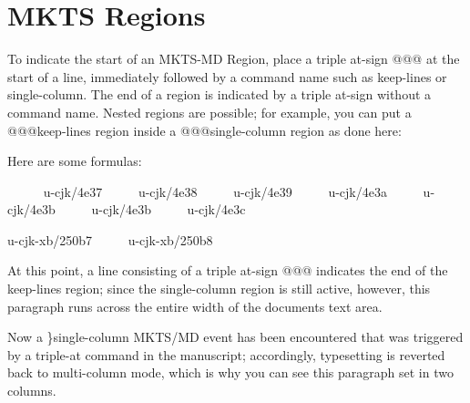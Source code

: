 
\mktsShowpar\par
\begin{multicols}{2}\mktsShowpar\par
\end{multicols}
\section{MKTS Regions 
}
\begin{multicols}{2}To indicate the start of an MKTS-MD Region, place a triple at-sign {\mktsStyleCode{}@@@}
at the start of a line, immediately followed by a command name such as
{\mktsStyleCode{}keep-lines} or {\mktsStyleCode{}single-column}. The end of a region is indicated by a
triple at-sign without a command name. Nested regions are possible; for example,
you can put a {\mktsStyleCode{}@@@keep-lines} region inside a {\mktsStyleCode{}@@@single-column} region as
done here:\mktsShowpar\par
\end{multicols}Here are some formulas:
\mktsShowpar\par
\begingroup{}     
{\mktsStyleCode{}u-cjk/4e37}     
{\mktsStyleCode{}u-cjk/4e38}     
{\mktsStyleCode{}u-cjk/4e39}     
{\mktsStyleCode{}u-cjk/4e3a}     
{\mktsStyleCode{}u-cjk/4e3b}     
{\mktsStyleCode{}u-cjk/4e3b}     
{\mktsStyleCode{}u-cjk/4e3c}     

{\mktsStyleCode{}u-cjk-xb/250b7}     
{\mktsStyleCode{}u-cjk-xb/250b8}     

\endgroup{}At this point, a line consisting of a triple at-sign {\mktsStyleCode{}@@@}
indicates the end of the {\mktsStyleCode{}keep-lines} region; since the
{\mktsStyleCode{}single-column} region is still active, however, {\mktsStyleItalic{}this
paragraph runs across the entire width} of the documents text
area.
\begin{multicols}{2}Now a {\mktsStyleCode{}\}single-column} MKTS/MD event has been encountered
that was triggered by a triple-at command in the manuscript;
accordingly, typesetting is reverted back to multi-column mode,
which is why you can see this paragraph set in two columns.\mktsShowpar\par
\end{multicols}\mktsShowpar\par
